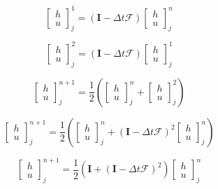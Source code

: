 \documentclass[12pt]{article}
\begin{document}
\[\left[\begin{array}{c}
h \\ u
\end{array}\right]^{1}_j = \left(\boldsymbol{I} - \Delta t\boldsymbol{\mathcal{F}} \right)\left[\begin{array}{c}
h \\ u
\end{array}\right]^{n}_j  \]

\[\left[\begin{array}{c}
h \\ u
\end{array}\right]^{2}_j = \left(\boldsymbol{I} - \Delta t\boldsymbol{\mathcal{F}} \right)\left[\begin{array}{c}
h \\ u
\end{array}\right]^{1}_j  \]

\[\left[\begin{array}{c}
h \\ u
\end{array}\right]^{n+1}_j = \frac{1}{2} \left(\left[\begin{array}{c}
h \\ u
\end{array}\right]^{n}_j + \left[\begin{array}{c}
h \\ u
\end{array}\right]^{2}_j\right)  \]

\[\left[\begin{array}{c}
h \\ u
\end{array}\right]^{n+1}_j = \frac{1}{2} \left(\left[\begin{array}{c}
h \\ u
\end{array}\right]^{n}_j + \left(\boldsymbol{I} - \Delta t\boldsymbol{\mathcal{F}} \right)^2 \left[\begin{array}{c}
h \\ u
\end{array}\right]^{n}_j\right)  \]

\[\left[\begin{array}{c}
h \\ u
\end{array}\right]^{n+1}_j = \frac{1}{2} \left(\boldsymbol{I} + \left(\boldsymbol{I} - \Delta t\boldsymbol{\mathcal{F}} \right)^2 \right) \left[\begin{array}{c}
h \\ u
\end{array}\right]^{n}_j  \]
\end{document}
